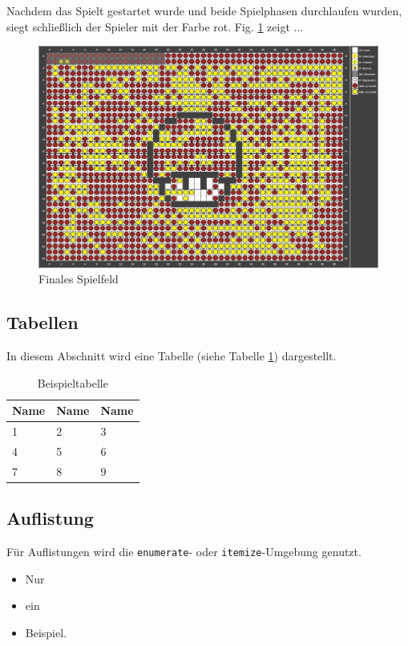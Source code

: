 \documentclass[conference]{IEEEtran}
\begin{document}
Nachdem das Spielt gestartet wurde und beide Spielphasen durchlaufen wurden, siegt schließlich der Spieler mit der Farbe rot. Fig. \ref{fig:reversi02} zeigt ...

\begin{figure}[htbp]
	\centering
	\includegraphics[width=0.7\linewidth]{figures/gamefield02.png}
	\caption[Spielfeld 02]{Finales Spielfeld}
	\label{fig:reversi02}
\end{figure}


\subsection{Tabellen}
In diesem Abschnitt wird eine Tabelle (siehe Tabelle \ref{tab:beispiel}) dargestellt.

\begin{table}[!h]
	\centering
  \caption{Beispieltabelle}
	\label{tab:beispiel}
	\begin{tabular}{|l|l|l|}
		\hline
		\textbf{Name} & \textbf{Name} & \textbf{Name}\\
		\hline
		1 & 2 & 3\\
		\hline
		4 & 5 & 6\\
		\hline
		7 & 8 & 9\\
		\hline
	\end{tabular}	
\end{table}


\subsection{Auflistung}
Für Auflistungen wird die \texttt{enumerate}- oder \texttt{itemize}-Umgebung genutzt.

\begin{itemize}
	\item Nur
	\item ein
	\item Beispiel.
\end{itemize}
\end{document}
